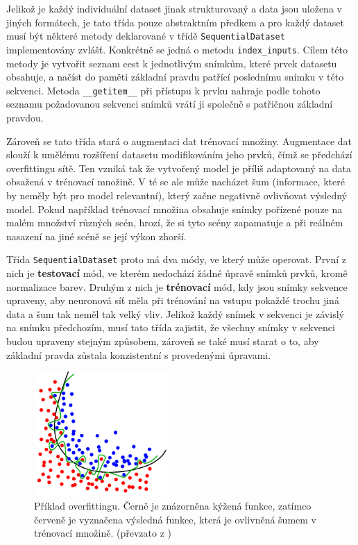 Jelikož je každý individuální dataset jinak strukturovaný a data jsou uložena v jiných formátech, je tato třída pouze abstraktním předkem a pro každý dataset musí být některé metody deklarované v třídě \texttt{SequentialDataset} implementovány zvlášť.
Konkrétně se jedná o metodu \texttt{index\_inputs}. Cílem této metody je vytvořit seznam cest k jednotlivým snímkům, které prvek datasetu obsahuje, a načíst do paměti základní pravdu patřící poslednímu snímku v této sekvenci.
Metoda \texttt{\_\_getitem\_\_} při přístupu k prvku nahraje podle tohoto seznamu požadovanou sekvenci snímků vrátí ji společně s patřičnou základní pravdou.

Zároveň se tato třída stará o augmentaci dat trénovací množiny.
Augmentace dat slouží k umělému rozšíření datasetu modifikováním jeho prvků, čímž se předchází overfittingu sítě.
Ten vzniká tak že vytvořený model je příliš adaptovaný na data obsažená v trénovací množině.
V té se ale může nacházet šum (informace, které by neměly být pro model relevantní), který začne negativně ovlivňovat výsledný model.
Pokud například trénovací množina obsahuje snímky pořízené pouze na malém množství různých scén, hrozí, že si tyto scény zapamatuje a při reálném nasazení na jiné scéně se její výkon zhorší.

Třída \texttt{SequentialDataset} proto má dva módy, ve který může operovat.
První z nich je \textbf{testovací} mód, ve kterém nedochází žádné úpravě snímků prvků, kromě normalizace barev.
Druhým z nich je \textbf{trénovací} mód, kdy jsou snímky sekvence upraveny, aby neuronová síť měla při trénování na vstupu pokaždé trochu jiná data a šum tak neměl tak velký vliv.
Jelikož každý snímek v sekvenci je závislý na snímku předchozím, musí tato třída zajistit, že všechny snímky v sekvenci budou upraveny stejným způsobem, zároveň se také musí starat o to, aby základní pravda zůstala konzistentní s provedenými úpravami.

\begin{figure}[h!]
	\centering
	\includegraphics[width=0.45\textwidth]{Figures/implementation/overfitting.pdf}
	\caption{Příklad overfittingu. Černě je znázorněna kýžená funkce, zatímco červeně je vyznačena výsledná funkce, která je ovlivněná šumem v trénovací množině. (převzato z \cite{wiki_overfitting})}
	\label{fig:overfitting}
\end{figure}

